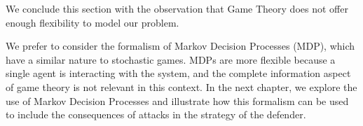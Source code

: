 We conclude this section with the observation that Game Theory does not offer enough flexibility to model our problem. 

We prefer to consider the formalism of Markov Decision Processes (MDP), which have a similar nature to stochastic games. MDPs are more flexible because a single agent is interacting with the system, and the complete information aspect of game theory is not relevant in this context. 
In the next chapter, we explore the use of Markov Decision Processes and illustrate how this formalism can be used to include the consequences of attacks in the strategy of the defender.
